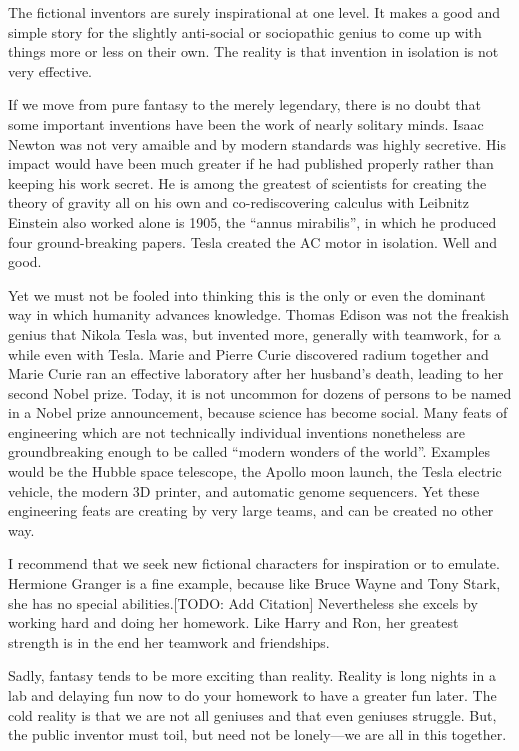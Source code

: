 \documentclass[
	fontsize=10pt, %
	twoside=false, %
	secnumdepth=1, %
]{kaobook}
\begin{document}
The fictional inventors are surely inspirational at one level.
It makes a good and simple story for the slightly anti-social or sociopathic genius to come up with things more or less on their own.
The reality is that invention in isolation is not very effective.

If we move from pure fantasy to the merely legendary, there is no doubt that
some important inventions have been the work of nearly solitary minds.
Isaac Newton was not very amaible and by modern standards was highly secretive.
His impact would have been much greater if he had published properly rather than keeping his work secret.
He is among the greatest of scientists for creating the theory of gravity
all on his own and co-rediscovering calculus with Leibnitz
Einstein also worked alone is 1905, the ``annus mirabilis'', in which he produced four ground-breaking papers.
Tesla created the AC motor in isolation. Well and good.

Yet we must not be fooled into thinking this is the only or even the dominant way in which humanity advances knowledge.
Thomas Edison was not the freakish genius that Nikola Tesla was, but invented more, generally with teamwork, for a while even with Tesla.
Marie and Pierre Curie discovered radium together and Marie Curie ran an effective laboratory after her husband's death, leading to her second Nobel prize.
Today, it is not uncommon for dozens of persons to be named in a Nobel prize announcement, because science has become social.
Many feats of engineering which are not technically individual inventions nonetheless are groundbreaking enough to
be called ``modern wonders of the world''.
Examples would be the Hubble space telescope, the Apollo moon launch, the Tesla electric vehicle, the modern 3D printer, and automatic genome sequencers.
Yet these engineering feats are creating by very large teams, and can be created no other way.

I recommend that we seek new fictional characters for inspiration or to emulate. Hermione Granger is a fine example, because like Bruce Wayne and Tony Stark,
she has no special abilities.[TODO: Add Citation]
Nevertheless she excels by working hard and doing her homework. Like Harry and Ron, her greatest strength is in the end her
teamwork and friendships.

Sadly, fantasy tends to be more exciting than reality.
Reality is long nights in a lab and delaying fun now to do your homework to have a greater fun later.
The cold reality is that we are not all geniuses and that even geniuses struggle.
But, the public inventor must toil, but need not be lonely---we are all in this together.
\end{document}
